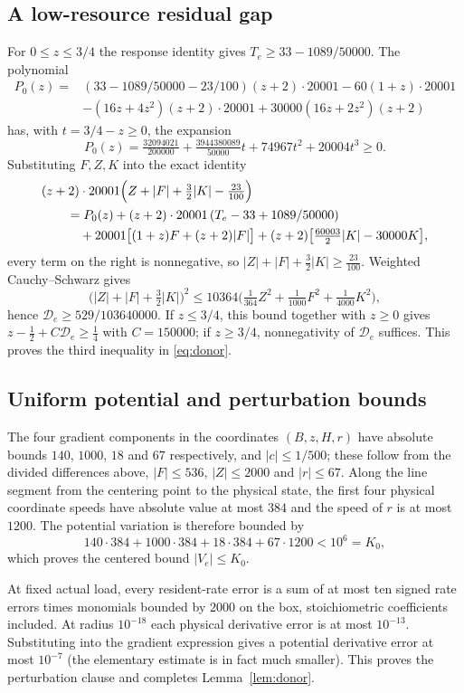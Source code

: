 \documentclass[11pt,a4paper]{article}
\theoremstyle{plain}
\theoremstyle{definition}
\theoremstyle{remark}
\newcommand{\D}{\mathcal D}
\begin{document}
\subsection{A low-resource residual gap}
For $0\le z\le3/4$ the response identity gives $T_e\ge33-1089/50000$. The polynomial
\begin{align*}
P_0(z)={}&(33-1089/50000-23/100)(z+2)\cdot20001-60(1+z)\cdot20001\\
&-(16z+4z^2)(z+2)\cdot20001+30000(16z+2z^2)(z+2)
\end{align*}
has, with $t=3/4-z\ge0$, the expansion
\[
P_0(z)=\tfrac{32094021}{200000}+\tfrac{3944380089}{50000}t+74967t^2+20004t^3\ge0 .
\]
Substituting $F,Z,K$ into the exact identity
\begin{align*}
&(z+2)\cdot20001\Bigl(Z+|F|+\tfrac32|K|-\tfrac{23}{100}\Bigr)\\
&\qquad=P_0(z)+(z+2)\cdot20001\,(T_e-33+1089/50000)\\
&\qquad\quad+20001\bigl[(1+z)F+(z+2)|F|\bigr]+(z+2)\bigl[\tfrac{60003}2|K|-30000K\bigr],
\end{align*}
every term on the right is nonnegative, so $|Z|+|F|+\tfrac32|K|\ge\tfrac{23}{100}$. Weighted Cauchy--Schwarz gives
\[
\bigl(|Z|+|F|+\tfrac32|K|\bigr)^2\le10364\bigl(\tfrac1{364}Z^2+\tfrac1{1000}F^2+\tfrac1{4000}K^2\bigr),
\]
hence $\D_e\ge529/103640000$. If $z\le3/4$, this bound together with $z\ge0$ gives $z-\tfrac12+C\D_e\ge\tfrac14$ with $C=150000$; if $z\ge3/4$, nonnegativity of $\D_e$ suffices. This proves the third inequality in \eqref{eq:donor}.

\subsection{Uniform potential and perturbation bounds}
The four gradient components in the coordinates $(B,z,H,r)$ have absolute bounds $140$, $1000$, $18$ and $67$ respectively, and $|c|\le1/500$; these follow from the divided differences above, $|F|\le536$, $|Z|\le2000$ and $|r|\le67$. Along the line segment from the centering point to the physical state, the first four physical coordinate speeds have absolute value at most $384$ and the speed of $r$ is at most $1200$. The potential variation is therefore bounded by
\[
140\cdot384+1000\cdot384+18\cdot384+67\cdot1200<10^6=K_0 ,
\]
which proves the centered bound $|V_e|\le K_0$.

At fixed actual load, every resident-rate error is a sum of at most ten signed rate errors times monomials bounded by $2000$ on the box, stoichiometric coefficients included. At radius $10^{-18}$ each physical derivative error is at most $10^{-13}$. Substituting into the gradient expression gives a potential derivative error at most $10^{-7}$ (the elementary estimate is in fact much smaller). This proves the perturbation clause and completes Lemma~\ref{lem:donor}.
\end{document}
